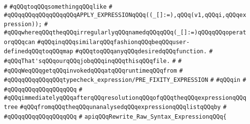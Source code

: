 \verb|#|\newline
\verb|#qQQqtoqQQqsomethingqQQqlike|\newline
\verb|#|\newline
\verb|#qQQqqQQqqQQqqQQqqQQqAPPLY_EXPRESSIONqQQq((_[]:=),qQQq(v1,qQQqi,qQQqexpression));|\newline
\verb|#|\newline
\verb|#qQQqwhereqQQqtheqQQqirregularlyqQQqnamedqQQqqQQq(_[]:=)qQQqqQQqoperatorqQQqcan|\newline
\verb|#qQQqinqQQqsimilarqQQqfashionqQQqbeqQQquser-definedqQQqtoqQQqmap|\newline
\verb|#qQQqtoqQQqanyqQQqdesiredqQQqfunction.|\newline
\verb|#|\newline
\verb|#qQQqThat'sqQQqourqQQqjobqQQqinqQQqthisqQQqfile.|\newline
\verb|#|\newline
\verb|#|\newline
\verb|#qQQqWeqQQqgetqQQqinvokedqQQqatqQQqruntimeqQQqfrom|\newline
\verb|#|\newline
\verb|#qQQqqQQqqQQqqQQqtypecheck_expression/PRE_FIXITY_EXPRESSION|\newline
\verb|#|\newline
\verb|#qQQqin|\newline
\verb|#|\newline
\verb|#qQQqqQQqqQQqqQQqqQQq|\newline
\verb|#|\newline
\verb|#qQQqimmediatelyqQQqafterqQQqresolutionqQQqofqQQqtheqQQqexpressionqQQqtree|\newline
\verb|#qQQqfromqQQqtheqQQqunanalysedqQQqexpressionqQQqlistqQQqby|\newline
\verb|#|\newline
\verb|#qQQqqQQqqQQqqQQqqQQq|\newline
\verb|#|\newline
\newline
\newline
\newline
\verb|apiqQQqRewrite_Raw_Syntax_ExpressionqQQq{|\newline
\newline
